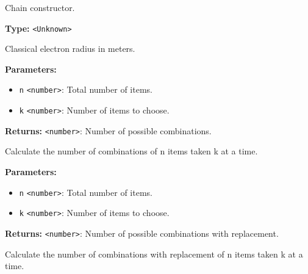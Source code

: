 \documentclass[12pt,a4paper]{article}
\begin{document}
\noindent Chain constructor.

\vspace{5mm}
\noindent {}\vspace{4mm}


\noindent \textbf{Type:} \texttt{<Unknown>}

\noindent Classical electron radius in meters.

\vspace{5mm}
\noindent {}


\noindent \textbf{Parameters:}
\begin{itemize}
  \item \texttt{n} \texttt{<number>}: Total number of items.
  \item \texttt{k} \texttt{<number>}: Number of items to choose.
\end{itemize}

\noindent \textbf{Returns:} \texttt{<number>}: Number of possible combinations.

\noindent Calculate the number of combinations of n items taken k at a time.

\vspace{5mm}
\noindent {}


\noindent \textbf{Parameters:}
\begin{itemize}
  \item \texttt{n} \texttt{<number>}: Total number of items.
  \item \texttt{k} \texttt{<number>}: Number of items to choose.
\end{itemize}

\noindent \textbf{Returns:} \texttt{<number>}: Number of possible combinations with replacement.

\noindent Calculate the number of combinations with replacement of n items taken k at a time.

\vspace{5mm}
\noindent {}
\end{document}
